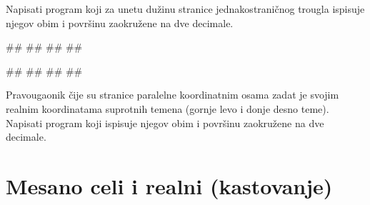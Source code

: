 \begin{Exercise}[label=p1.1_03] 
Napisati program koji za unetu dužinu stranice jednakostraničnog trougla ispisuje njegov obim i površinu zaokružene na dve decimale. 

\begin{miditest}
\begin{upotreba}{1}
#\naslovInt#
##
##
##
\end{upotreba}
\end{miditest}
\begin{miditest}
\begin{upotreba}{1}
#\naslovInt#
##
##
##
\end{upotreba}
\end{miditest}
\end{Exercise}
\begin{Answer}[ref=p1.1_03]
\end{Answer}


\begin{Exercise}[label=p1_13] 
Pravougaonik čije su stranice paralelne koordinatnim osama zadat je svojim realnim koordinatama suprotnih temena (gornje levo i donje desno teme). Napisati program koji ispisuje njegov obim i površinu zaokružene na dve decimale. 

\end{Exercise}

\section{Mesano celi i realni (kastovanje)}

